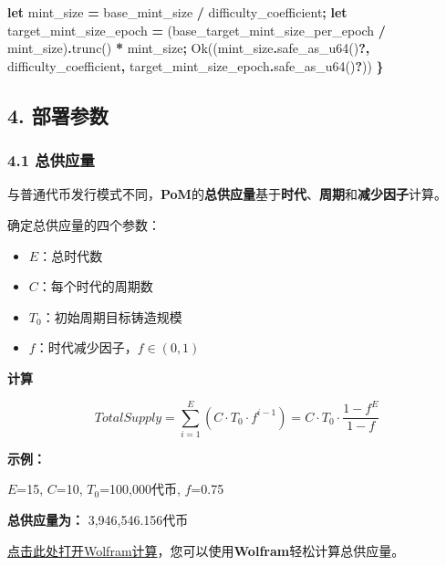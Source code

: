 \documentclass[
]{article}
\newenvironment{Shaded}{\begin{snugshade}}{\end{snugshade}}
\newcommand{\ConstantTok}[1]{\textcolor[rgb]{0.56,0.35,0.01}{#1}}
\newcommand{\KeywordTok}[1]{\textcolor[rgb]{0.13,0.29,0.53}{\textbf{#1}}}
\newcommand{\NormalTok}[1]{#1}
\newcommand{\OperatorTok}[1]{\textcolor[rgb]{0.81,0.36,0.00}{\textbf{#1}}}
\providecommand{\tightlist}{%
  \setlength{\itemsep}{0pt}\setlength{\parskip}{0pt}}
\begin{document}
\begin{Shaded}
\begin{Highlighting}[numbers=left,,]
  \KeywordTok{let}\NormalTok{ mint\_size }\OperatorTok{=}\NormalTok{  base\_mint\_size }\OperatorTok{/}\NormalTok{ difficulty\_coefficient}\OperatorTok{;}
  \KeywordTok{let}\NormalTok{ target\_mint\_size\_epoch }\OperatorTok{=}\NormalTok{ (base\_target\_mint\_size\_per\_epoch }\OperatorTok{/}\NormalTok{ mint\_size)}\OperatorTok{.}\NormalTok{trunc() }
  \OperatorTok{*}\NormalTok{ mint\_size}\OperatorTok{;}
  \ConstantTok{Ok}\NormalTok{((mint\_size}\OperatorTok{.}\NormalTok{safe\_as\_u64()}\OperatorTok{?,}\NormalTok{ difficulty\_coefficient}\OperatorTok{,}\NormalTok{ target\_mint\_size\_epoch}\OperatorTok{.}\NormalTok{safe\_as\_u64()}\OperatorTok{?}\NormalTok{))}
\OperatorTok{\}}
\end{Highlighting}
\end{Shaded}

\subsection{4. 部署参数}\label{ux90e8ux7f72ux53c2ux6570}

\subsubsection{4.1 总供应量}\label{ux603bux4f9bux5e94ux91cf}

与普通代币发行模式不同，\textbf{PoM}的\textbf{总供应量}基于\textbf{时代}、\textbf{周期}和\textbf{减少因子}计算。

确定总供应量的四个参数：

\begin{itemize}
\tightlist
\item
  \(E\)：总时代数
\item
  \(C\)：每个时代的周期数
\item
  \(T_0\)：初始周期目标铸造规模
\item
  \(f\)：时代减少因子，\(f \in (0,1)\)
\end{itemize}

\textbf{计算}

\begin{equation}
TotalSupply = \sum_{i=1}^{E}(C \cdot T_0 \cdot f^{i-1})=C \cdot T_0 \cdot \frac{1-f^E}{1-f}
\end{equation}

\textbf{示例：}

\(E\)=15, \(C\)=10, \(T_0\)=100,000代币, \(f\)=0.75

\textbf{总供应量为：} 3,946,546.156代币

\href{https://www.wolframalpha.com/input?i=sum+10*100000*0.75\%5E\%28i-1\%29\%2C+i+\%3D+1+to+15}{点击此处打开Wolfram计算}，您可以使用\textbf{Wolfram}轻松计算总供应量。
\end{document}
